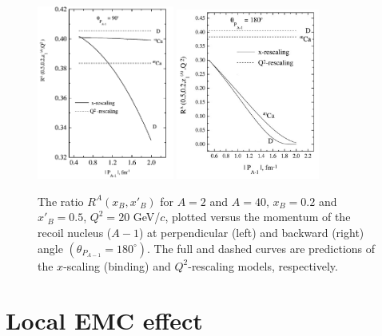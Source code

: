 \begin{figure}
  \begin{center}
    \includegraphics[angle=0, width=0.4\textwidth]{./fig-chap1/ratio_a1}
    \includegraphics[angle=0, width=0.42\textwidth]{./fig-chap1/ratio_a}
    \caption{The ratio $R^A(x_B,x'_B)$ for $A = 2$ and $A = 40$, $x_B = 0.2$ and $x'_B = 0.5$, $Q^2 = 20$ GeV/$c$, plotted versus the momentum of the recoil nucleus ($A-1$) at perpendicular (left) and backward (right) angle $(\theta_{P_{A-1}} = 180^{\circ})$. The full and dashed curves are predictions of the $x$-scaling (binding) and $Q^2$-rescaling models, respectively.}
    \label{fig:ratio_a}
  \end{center}
\end{figure}

\section{Local EMC effect}

